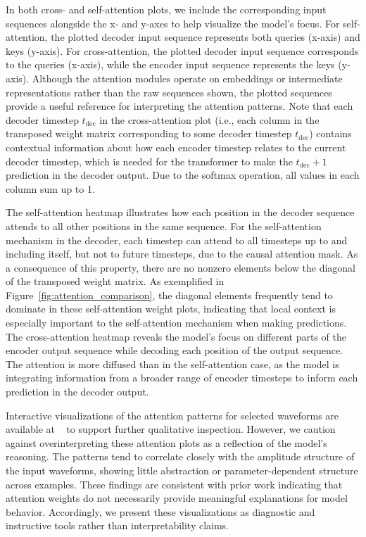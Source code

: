 \documentclass[12pt]{iopart}
\begin{document}
In both cross- and self-attention plots, we include the corresponding input sequences alongside the x- and y-axes to help visualize the model's focus. For self-attention, the plotted decoder input sequence represents both queries (x-axis) and keys (y-axis). For cross-attention, the plotted decoder input sequence corresponds to the queries (x-axis), while the encoder input sequence represents the keys (y-axis). Although the attention modules operate on embeddings or intermediate representations rather than the raw sequences shown, the plotted sequences provide a useful reference for interpreting the attention patterns. Note that each decoder timestep $t_{\textrm{dec}}$ in the cross-attention plot (i.e., each column in the transposed weight matrix corresponding to some decoder timestep $t_{\textrm{dec}}$) contains contextual information about how each encoder timestep relates to the current decoder timestep, which is needed for the transformer to make the $t_{\textrm{dec}}+1$ prediction in the decoder output. Due to the softmax operation, all values in each column sum up to 1.

The self-attention heatmap illustrates how each position in the decoder sequence attends to all other positions in the same sequence. For the self-attention mechanism in the decoder, each timestep can attend to all timesteps up to and including itself, but not to future timesteps, due to the causal attention mask. As a consequence of this property, there are no nonzero elements below the diagonal of the transposed weight matrix. As exemplified in Figure~\ref{fig:attention_comparison}, the diagonal elements frequently tend to dominate in these self-attention weight plots, indicating that local context is especially important to the self-attention mechanism when making predictions. The cross-attention heatmap reveals the model's focus on different parts of the encoder output sequence while decoding each position of the output sequence. The attention is more diffused than in the self-attention case, as the model is integrating information from a broader range of encoder timesteps to inform each prediction in the decoder output.

Interactive visualizations of the attention patterns for selected waveforms are available at ~\cite{githubhom} to support further qualitative inspection. However, we caution against overinterpreting these attention plots as a reflection of the model’s reasoning. The patterns tend to correlate closely with the amplitude structure of the input waveforms, showing little abstraction or parameter-dependent structure across examples. These findings are consistent with prior work indicating that attention weights do not necessarily provide meaningful explanations for model behavior\cite{jain2019attention}. Accordingly, we present these visualizations as diagnostic and instructive tools rather than interpretability claims.
\end{document}

